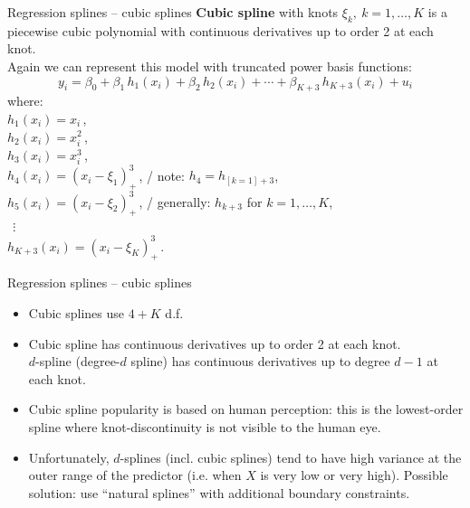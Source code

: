 \documentclass{beamer}
\begin{document}
\begin{frame}{Regression splines -- cubic splines}
\textbf{Cubic spline} with knots $\xi_k,~k=1,\dots, K$ is a piecewise cubic polynomial with continuous derivatives up to order 2 at each knot.\\
\medskip
Again we can represent this model with truncated power basis functions:
$$y_i = \beta_0 + \beta_1 \, h_1 (x_i) + \beta_2 \, h_2 (x_i) + \cdots + \beta_{K+3} \, h_{K+3} (x_i) + u_i  $$
where:\\
\smallskip
\qquad $h_1 (x_i) = x_i$\,,\\
\smallskip
\qquad $h_2 (x_i) = x_i^2$\,,\\
\smallskip
\qquad $h_3 (x_i) = x_i^3$\,,\\
\smallskip
\qquad $h_4 (x_i) = (x_i-\xi_1)_{+}^3 \,$, \qquad \qquad / note: $h_4 = h_{[k=1]+3}$,\\
\smallskip
\qquad $h_5 (x_i) = (x_i-\xi_2)_{+}^3 \,$, \qquad \qquad / generally: $h_{k+3}$ for $k=1,\dots,K$,\\
\qquad $~~\vdots$ \\
\qquad $h_{K+3} (x_i) = (x_i-\xi_K)_{+}^3 \,$.\\
\medskip
\end{frame}
\begin{frame}{Regression splines -- cubic splines}
\begin{itemize}
    \item Cubic splines use $4+K$ d.f.
    \smallskip
    \item Cubic spline has continuous derivatives up to order 2 at each knot.\\
    $d$-spline (degree-$d$ spline) has continuous derivatives up to degree $d-1$ at each knot.
    \smallskip
    \item Cubic spline popularity is based on human perception: this is the lowest-order spline where knot-discontinuity is not visible to the human eye.
    \smallskip
    \item Unfortunately, $d$-splines (incl. cubic splines) tend to have high variance at the outer range of the predictor (i.e. when $X$ is very low or very high). Possible solution: use ``natural splines'' with additional boundary constraints.
\end{itemize}
\end{frame}
\end{document}

